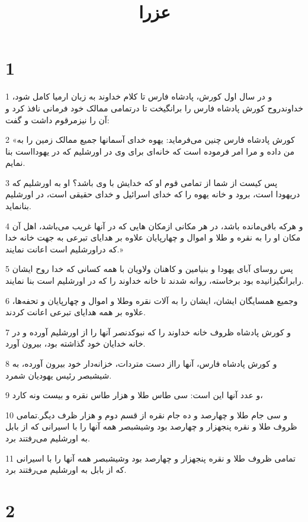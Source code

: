 

\title{عزرا}

 
\chapter{1}

\par 1 و در سال اول کورش، پادشاه فارس تا کلام خداوند به زبان ارمیا کامل شود، خداوندروح کورش پادشاه فارس را برانگیخت تا درتمامی ممالک خود فرمانی نافذ کرد و آن را نیزمرقوم داشت و گفت:
\par 2 «کورش پادشاه فارس چنین می‌فرماید: یهوه خدای آسمانها جمیع ممالک زمین را به من داده و مرا امر فرموده است که خانه‌ای برای وی در اورشلیم که در یهودااست بنا نمایم.
\par 3 پس کیست از شما از تمامی قوم او که خدایش با وی باشد؟ او به اورشلیم که دریهودا است، برود و خانه یهوه را که خدای اسرائیل و خدای حقیقی است، در اورشلیم بنانماید.
\par 4 و هر‌که باقی‌مانده باشد، در هر مکانی ازمکان هایی که در آنها غریب می‌باشد، اهل آن مکان او را به نقره و طلا و اموال و چهارپایان علاوه بر هدایای تبرعی به جهت خانه خدا که دراورشلیم است اعانت نمایند.»
\par 5 پس روسای آبای یهودا و بنیامین و کاهنان ولاویان با همه کسانی که خدا روح ایشان رابرانگیزانیده بود برخاسته، روانه شدند تا خانه خداوند را که در اورشلیم است بنا نمایند.
\par 6 وجمیع همسایگان ایشان، ایشان را به آلات نقره وطلا و اموال و چهارپایان و تحفه‌ها، علاوه بر همه هدایای تبرعی اعانت کردند.
\par 7 و کورش پادشاه ظروف خانه خداوند را که نبوکدنصر آنها را از اورشلیم آورده و در خانه خدایان خود گذاشته بود، بیرون آورد.
\par 8 و کورش پادشاه فارس، آنها رااز دست متردات، خزانه‌دار خود بیرون آورده، به شیشبصر رئیس یهودیان شمرد.
\par 9 و عدد آنها این است: سی طاس طلا و هزار طاس نقره و بیست ونه کارد،
\par 10 و سی جام طلا و چهارصد و ده جام نقره از قسم دوم و هزار ظرف دیگر.تمامی ظروف طلا و نقره پنجهزار و چهارصد بود وشیشبصر همه آنها را با اسیرانی که از بابل به اورشلیم می‌رفتند برد.
\par 11 تمامی ظروف طلا و نقره پنجهزار و چهارصد بود وشیشبصر همه آنها را با اسیرانی که از بابل به اورشلیم می‌رفتند برد.
 
\chapter{2}

